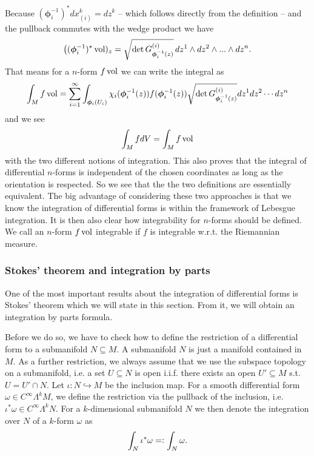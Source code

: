 \documentclass[../master_thesis.tex]{subfiles}
\begin{document}
Because $(\boldsymbol{\phi}_i^{-1})^* dx_{(i)}^k = dz^k$ -- which follows directly from the 
definition -- and the pullback commutes with the wedge product we have
\begin{align*}
    \big( (\boldsymbol{\phi}_i^{-1})^* \operatorname{vol})_z =  
        \sqrt{ \det G^{(i)}_{\boldsymbol{\phi}_i^{-1}(z)}} \,
        dz^1 \wedge dz^2 \wedge ... \wedge dz^n.
\end{align*}
That means for a $n$-form $f \operatorname{vol}$ we can write the integral as
\begin{align*}
    \int_M f \operatorname{vol} = \sum_{i=1}^\infty \int_{\boldsymbol{\phi}_i(U_i)} 
    \chi_i(\boldsymbol{\phi}_i^{-1}(z)) f(\boldsymbol{\phi}_i^{-1}(z))
        \sqrt{ \det G^{(i)}_{\boldsymbol{\phi}_i^{-1}(z)}} dz^1 dz^2 \cdots dz^n
\end{align*} 
and we see 
\begin{align*}
    \int_M f dV = \int_M f \operatorname{vol}
\end{align*}
with the two different notions of integration. This also proves that 
the integral of differential $n$-forms is independent of the chosen 
coordinates as long as the orientation is respected. So we see that the
the two definitions are essentially equivalent.
The big advantage of considering these two
approaches is that we know the integration of 
differential forms is within the framework of Lebesgue integration. 
It is then also 
clear how integrability for $n$-forms should be defined. We call an 
$n$-form $f \operatorname{vol}$ integrable if $f$ is integrable w.r.t. the Riemannian measure.

\subsubsection{Stokes' theorem and integration by parts} 

One of the most important results about the integration of differential forms
is Stokes' theorem which we will state in this section. From it, we will 
obtain an integration by parts formula.

Before we do so, we have to check how to define the restriction of a
differential form to a submanifold $N \subseteq M$. A submanifold $N$ 
is just a manifold contained in $M$. As a further restriction, we always assume
that we use the subspace topology on a submanifold, i.e. a set $U \subseteq N$ 
is open i.i.f. there exists an open $U' \subseteq M$ s.t. $U = U' \cap N$.
Let $\iota: N \hookrightarrow M$ be the inclusion map. For a 
smooth differential form $\omega \in C^\infty \Lambda^k M$, we define 
the restriction via the pullback of the inclusion, i.e. 
$\iota^* \omega \in C^\infty \Lambda^k N$. 
For a $k$-dimensional submanifold $N$ we then denote the integration over $N$ of a 
$k$-form $\omega$ as
\begin{align*}
    \int_N \iota^*\omega =\vcentcolon \int_N \omega.
\end{align*} 
\end{document}
